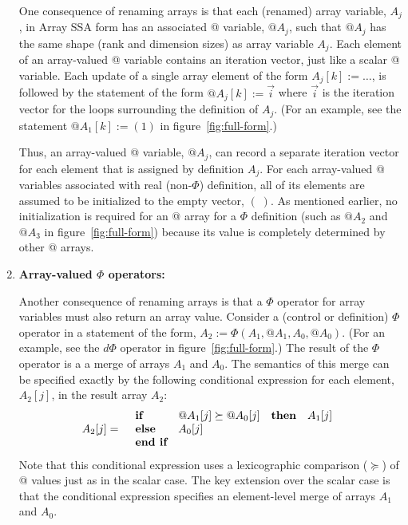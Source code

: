 \begin{enumerate}
One consequence of renaming arrays is that
each (renamed) array variable, $A_j$, in Array SSA form has an associated 
@ variable, $@A_j$, such that $@A_j$ has
the same shape (rank and dimension sizes) as array variable $A_j$.
Each element of an array-valued @ variable contains an iteration 
vector, just like a scalar @ variable.
Each update of a single array element of the form $A_j[k] := \ldots$, 
is followed by the statement of the form $@A_j[k] := \vec{i}$
where $\vec{i}$ is the iteration vector for the loops surrounding
the definition of $A_j$.
(For an example, see the statement $@A_1[k] := (1)$
in figure~\ref{fig:full-form}.)

Thus, an array-valued @ variable, $@A_j$,  
can record a separate iteration vector for
each element that is assigned by definition $A_j$.
For each array-valued @ variables associated with
real (non-$\Phi$) definition, all of its elements are assumed to be initialized to the empty vector, $(\;)$.
As mentioned earlier,
no initialization is required
for an @ array for a $\Phi$ definition (such as $@A_2$ and $@A_3$
in figure~\ref{fig:full-form})
because its value is completely determined by other @ arrays.


\item {\bf Array-valued  $\Phi$ operators:}
\label{array:phi}

Another consequence of renaming arrays is that
a $\Phi$ operator
for array variables must also return an
array value.  Consider a (control or definition) $\Phi$ operator in
a statement of
the form, $A_2 := \Phi(A_1, @A_1, A_0, @A_0)$.  (For an example,
see the $d\Phi$ operator 
in figure~\ref{fig:full-form}.)
The result of the $\Phi$ operator is a
a merge of arrays $A_1$ and $A_0$.  The semantics of
this merge can be specified exactly
by the following conditional expression
for each element, $A_2[j]$, in the result array $A_2$:
\begin{eqnarray*}
A_2[j] & = &
  \begin{array}{llll}
\mbox{\bf if} & @A_1[j] \succeq @A_0[j] & {\bf then} & A_1[j] \\
\mbox{\bf else} & A_0[j] \\
\mbox{\bf end if}
  \end{array}
\end{eqnarray*}
Note that this conditional expression uses a lexicographic
comparison ($\succeq$) of @ values just as
in the scalar case.
The key extension over the scalar case is that the conditional expression
specifies an element-level merge of arrays $A_1$ and $A_0$.
\end{enumerate}

